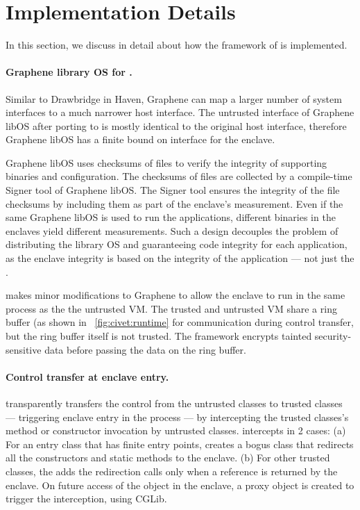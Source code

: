 \section{Implementation Details}
\label{sec:civet:impl}

In this section, we discuss in detail about how the framework of \sysname{}
is implemented. 


\paragraph{Graphene library OS for \sgx{}.}
Similar to Drawbridge in Haven, Graphene \libos{} can map a larger number of system interfaces
to a much narrower host interface.
The untrusted interface of Graphene libOS after porting to \sgx{}
is mostly identical to the original host interface,
therefore Graphene libOS has a finite  bound on interface for the enclave.

Graphene libOS uses checksums of files to verify the integrity of supporting binaries and configuration.
The checksums of files are collected by a compile-time Signer tool of Graphene libOS.
The Signer tool ensures the integrity of the file checksums
by including them as part of the enclave's measurement.
Even if the same Graphene libOS is used
to run the applications,
different binaries in the enclaves yield different measurements. 
Such a design decouples the problem of distributing the library OS
and guaranteeing code integrity for each application, as the enclave integrity is based on the integrity of the application --- not just the \libos{}.
 
\sysname{} makes minor modifications to Graphene \libos{} to allow
the enclave to run
in the same process as the the untrusted \java{} VM.
The trusted and untrusted VM share a ring buffer (as shown in ~\ref{fig:civet:runtime} for communication during control transfer,
but the ring buffer itself is not trusted. The \sysname{} framework encrypts tainted security-sensitive data before passing the data on the ring buffer.
 
\paragraph{Control transfer at enclave entry.}

\sysname{} transparently transfers the control from the untrusted classes to trusted classes --- triggering enclave entry in the process ---
by intercepting the trusted classes's method or constructor invocation by untrusted classes.
\sysname{} intercepts in 2 cases:
(a) For an entry class that has finite entry points,
\sysname{} creates a bogus class that redirects all the constructors and static methods to the enclave.
(b) For other trusted classes, the \sysname{} adds the redirection calls only when a reference is returned by the enclave.
On future access of the object in the enclave, a proxy object is created to trigger the interception, using CGLib.

